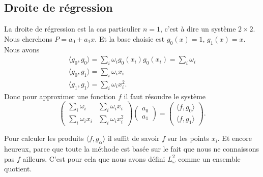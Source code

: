 \subsection{Droite de régression}

La droite de régression est la cas particulier \( n=1\), c'est à dire un système \( 2\times 2\). Nous cherchons \( P=a_0+a_1x\). Et la base choisie est \( g_0(x)=1\), \( g_1(x)=x\). Nous avons
\begin{subequations}
    \begin{align}
        \langle g_0, g_0\rangle =\sum_i\omega_ig_0(x_i)g_0(x_i)=\sum_i\omega_i\\
        \langle g_0, g_1\rangle =\sum_i\omega_ix_i\\
        \langle g_1, g_1\rangle =\sum_i\omega_ix_i^2.
    \end{align}
\end{subequations}
Donc pour approximer une fonction \( f\) il faut résoudre le système
\begin{equation}
    \begin{pmatrix}
        \sum_i\omega_i    &   \sum_i\omega_ix_i    \\
        \sum_i\omega_ix_i    &   \sum_i\omega_ix_i^2
    \end{pmatrix}\begin{pmatrix}
        a_0    \\
        a_1
    \end{pmatrix}=
    \begin{pmatrix}
        \langle f, g_0\rangle     \\
        \langle f, g_1\rangle
    \end{pmatrix}.
\end{equation}

Pour calculer les produits \( \langle f, g_{\alpha}\rangle \) il suffit de savoir \( f\) sur les points \( x_i\). Et encore heureux, parce que toute la méthode est basée sur le fait que nous ne connaissons pas \( f\) ailleurs. C'est pour cela que nous avons défini \( L^2_{\omega}\) comme un ensemble quotient.

